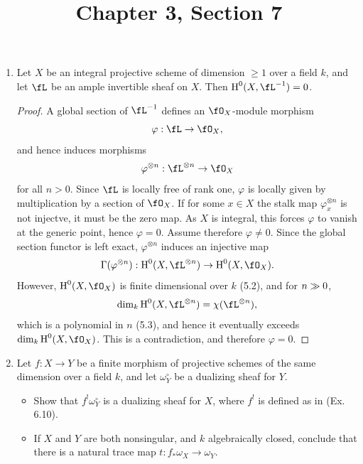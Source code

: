\documentclass[a4paper]{article}
\title{Chapter 3, Section 7}
\begin{document}
\maketitle

\begin{enumerate} [label=\textbf{\arabic*.}, leftmargin=0em]

  \item Let $X$ be an integral projective scheme of dimension $\geq 1$ over a field $k$, and let $\fL$ be an ample invertible sheaf on $X$. Then $\cH^0(X, \fL^{-1}) = 0$.

        \begin{proof}
          A global section of $\fL^{-1}$ defines an $\fO_X$-module morphism
          \begin{equation*}
            \varphi : \fL \to \fO_X,
          \end{equation*}
          and hence induces morphisms
          \begin{equation*}
            \varphi^{\otimes n} : \fL^{\otimes n} \to \fO_X
          \end{equation*}
          for all $n > 0$.
          Since $\fL$ is locally free of rank one, $\varphi$ is locally given by multiplication by a section of $\fO_X$.
          If for some $x \in X$ the stalk map $\varphi_x^{\otimes n}$ is not injectve, it must be the zero map.
          As $X$ is integral, this forces $\varphi$ to vanish at the generic point, hence $\varphi = 0$.
          Assume therefore $\varphi \neq 0$.
          Since the global section functor is left exact, $\varphi^{\otimes n}$ induces an injective map
          \begin{equation*}
            \Gamma(\varphi^{\otimes n}) : \cH^0(X, \fL^{\otimes n}) \to \cH^0(X, \fO_X).
          \end{equation*}
          However, $\cH^0(X, \fO_X)$ is finite dimensional over $k$ (5.2), and for $n \gg 0$,
          \begin{equation*}
            \dim_k \cH^0(X, \fL^{\otimes n}) = \chi(\fL^{\otimes n}),
          \end{equation*}
          which is a polynomial in $n$ (5.3), and hence it eventually exceeds $\dim_k \cH^0(X, \fO_X)$.
          This is a contradiction, and therefore $\varphi = 0$.
        \end{proof}

  \item Let $f : X \to Y$ be a finite morphism of projective schemes of the same dimension over a field $k$, and let $\omega_Y^\circ$ be a dualizing sheaf for $Y$.
        \begin{itemize}
          \item[(a)] Show that $f^! \omega_Y^\circ$ is a dualizing sheaf for $X$, where $f^!$ is defined as in (Ex. 6.10).
          \item[(b)] If $X$ and $Y$ are both nonsingular, and $k$ algebraically closed, conclude that there is a natural trace map $t : f_* \omega_X \to \omega_Y$.
        \end{itemize}


\end{enumerate}
\end{document}
